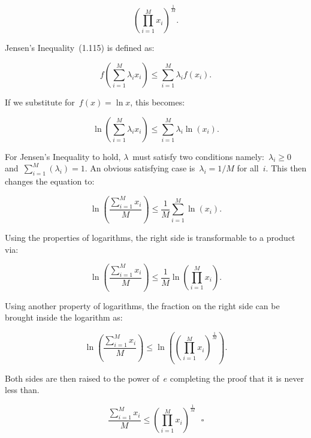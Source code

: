 \documentclass{report}
\begin{document}
  \[ \left( \prod_{i=1}^{M}x_i \right)^\frac{1}{M}\textrm{.} \]
  
  Jensen's Inequality~(1.115) is defined as:
  
  \[ f \left( \sum_{i=1}^M{\lambda_{i} x_i} \right) \leq \sum_{i=1}^M{\lambda_{i} f(x_i)}\textrm{.}\]
  
  If we substitute for~$f(x)=\ln x$, this becomes:

  \[ \ln \left( \sum_{i=1}^M{\lambda_{i} x_i} \right) \leq \sum_{i=1}^M{\lambda_{i} \ln(x_i)}\textrm{.} \]
  
  For Jensen's Inequality to hold, $\lambda$~must satisfy two conditions namely:~$\lambda_i \geq 0$ and~$\sum_{i=1}^{M}\left( \lambda_i \right) = 1$.  An obvious satisfying case is~$\lambda_i=1/M$ for all~$i$.  This then changes the equation to:
  
  \[ \ln \left( \frac{\sum_{i=1}^{M}{x_i}}{M} \right) \leq \frac{1}{M}\sum_{i=1}^M{\ln(x_i)}\textrm{.} \]
  
  Using the properties of logarithms, the right side is transformable to a product via:
  
  \[ \ln \left( \frac{\sum_{i=1}^{M}{x_i}}{M} \right) \leq \frac{1}{M}{\ln \left( \prod_{i=1}^M{x_i} \right)}\textrm{.} \]
  
  Using another property of logarithms, the fraction on the right side can be brought inside the logarithm as:
  
  \[ \ln \left( \frac{\sum_{i=1}^{M}{x_i}}{M} \right) \leq \ln \left( \left( \prod_{i=1}^M{x_i}\right)^\frac{1}{M} \right) \textrm{.} \]
  
  Both sides are then raised to the power of~$e$ completing the proof that it is never less than.
  
  \[ \frac{\sum_{i=1}^{M}{x_i}}{M} \leq \left( \prod_{i=1}^M{x_i}\right)^\frac{1}{M}  ~~~\square \]
\end{document}
